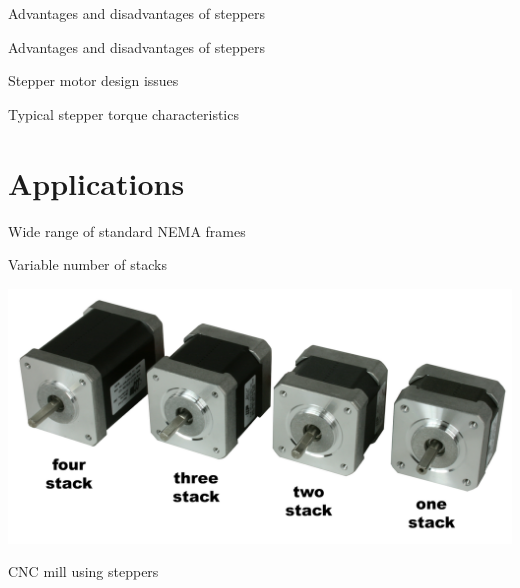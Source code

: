 \documentclass[compress]{beamer}
\begin{document}
{
    \begin{frame}{Advantages and disadvantages of steppers}
    \end{frame}
}

{
    \begin{frame}{Advantages and disadvantages of steppers}
    \end{frame}
}
{
    \begin{frame}{Stepper motor design issues}
    \end{frame}
}

{
    \begin{frame}{Typical stepper torque characteristics}
    \end{frame}
}

\section{Applications}

{
    \begin{frame}{Wide range of standard NEMA frames}
    \end{frame}
}

\begin{frame}{Variable number of stacks}

    \begin{center}
        \includegraphics[width=0.8\linewidth]{stepper-stacks-size}
    \end{center}
\end{frame}

{
    \begin{frame}{CNC mill using steppers}
    \end{frame}
}
\end{document}
